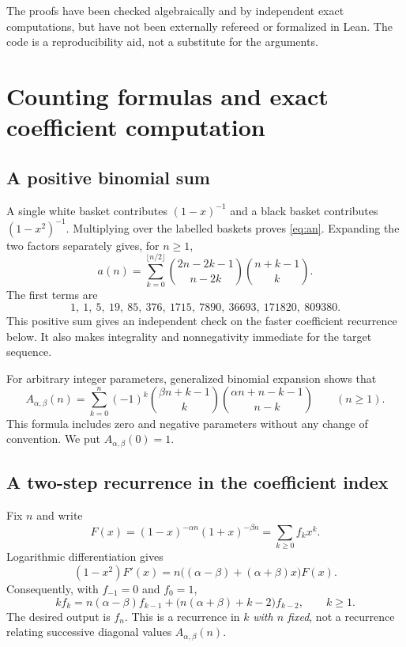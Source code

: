 \documentclass[11pt,a4paper]{article}
\numberwithin{equation}{section}
\theoremstyle{definition}
\theoremstyle{remark}
\newcommand{\A}{A_{\alpha,\beta}}
\begin{document}
The proofs have been checked algebraically and by independent exact
computations, but have not been externally refereed or formalized in Lean.
The code is a reproducibility aid, not a substitute for the arguments.

\section{Counting formulas and exact coefficient computation}
\label{sec:coeff}

\subsection{A positive binomial sum}
A single white basket contributes $(1-x)^{-1}$ and a black basket contributes
$(1-x^2)^{-1}$. Multiplying over the labelled baskets proves
\eqref{eq:an}. Expanding the two factors separately gives, for $n\ge1$,
\begin{equation}\label{eq:positive-sum}
 a(n)=\sum_{k=0}^{\lfloor n/2\rfloor}
 \binom{2n-2k-1}{n-2k}\binom{n+k-1}{k}.
\end{equation}
The first terms are
\[
 1,\ 1,\ 5,\ 19,\ 85,\ 376,\ 1715,\ 7890,\ 36693,\ 171820,\ 809380.
\]
This positive sum gives an independent check on the faster coefficient
recurrence below. It also makes integrality and nonnegativity immediate for
the target sequence.

For arbitrary integer parameters, generalized binomial expansion shows that
\begin{equation}\label{eq:signed-sum}
 \A(n)=\sum_{k=0}^n(-1)^k
 \binom{\beta n+k-1}{k}
 \binom{\alpha n+n-k-1}{n-k}\qquad(n\ge1).
\end{equation}
This formula includes zero and negative parameters without any change of
convention. We put $\A(0)=1$.

\subsection{A two-step recurrence in the coefficient index}
Fix $n$ and write
\[
 F(x)=(1-x)^{-\alpha n}(1+x)^{-\beta n}
      =\sum_{k\ge0}f_kx^k.
\]
Logarithmic differentiation gives
\[
 (1-x^2)F'(x)=n\bigl((\alpha-\beta)+(\alpha+\beta)x\bigr)F(x).
\]
Consequently, with $f_{-1}=0$ and $f_0=1$,
\begin{equation}\label{eq:coefficient-recurrence}
 kf_k=n(\alpha-\beta)f_{k-1}
      +\bigl(n(\alpha+\beta)+k-2\bigr)f_{k-2},\qquad k\ge1.
\end{equation}
The desired output is $f_n$. This is a recurrence in $k$ \emph{with $n$
fixed}, not a recurrence relating successive diagonal values $\A(n)$.
\end{document}
